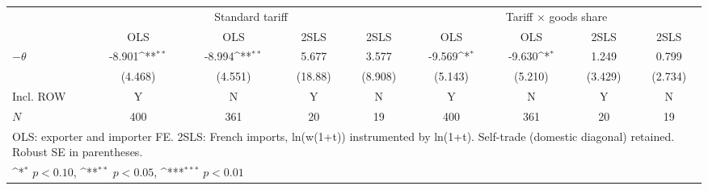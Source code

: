 {
\def\sym#1{\ifmmode^{#1}\else\(^{#1}\)\fi}
\begin{tabular}{l*{8}{c}}
\toprule
            &\multicolumn{4}{c}{Standard tariff}                                                    &\multicolumn{4}{c}{Tariff \(\times\) goods share}                                      \\\cmidrule(lr){2-5}\cmidrule(lr){6-9}
            &\multicolumn{1}{c}{OLS}&\multicolumn{1}{c}{OLS}&\multicolumn{1}{c}{2SLS}&\multicolumn{1}{c}{2SLS}&\multicolumn{1}{c}{OLS}&\multicolumn{1}{c}{OLS}&\multicolumn{1}{c}{2SLS}&\multicolumn{1}{c}{2SLS}\\
\midrule
$-\theta$   &      -8.901\sym{**} &      -8.994\sym{**} &       5.677         &       3.577         &      -9.569\sym{*}  &      -9.630\sym{*}  &       1.249         &       0.799         \\
            &     (4.468)         &     (4.551)         &     (18.88)         &     (8.908)         &     (5.143)         &     (5.210)         &     (3.429)         &     (2.734)         \\
\midrule
Incl. ROW   &           Y         &           N         &           Y         &           N         &           Y         &           N         &           Y         &           N         \\
\(N\)       &         400         &         361         &          20         &          19         &         400         &         361         &          20         &          19         \\
\bottomrule
\multicolumn{9}{l}{\footnotesize OLS: exporter and importer FE. 2SLS: French imports, ln(w(1+t)) instrumented by ln(1+t). Self-trade (domestic diagonal) retained. Robust SE in parentheses.}\\
\multicolumn{9}{l}{\footnotesize \sym{*} \(p<0.10\), \sym{**} \(p<0.05\), \sym{***} \(p<0.01\)}\\
\end{tabular}
}
